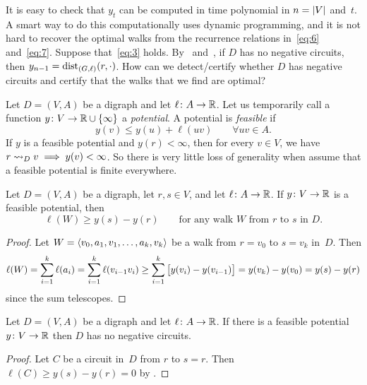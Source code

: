 \documentclass[10pt,reqno]{amsart}
\begin{document}
It is easy to check that \(y_t\) can be computed in time polynomial in
\(n = \card{V}\) and~\(t\).  A smart way to do this computationally
uses dynamic programming, and it is not hard to recover the optimal
walks from the recurrence relations in~\eqref{eq:6} and~\eqref{eq:7}.
Suppose that~\eqref{eq:3} holds.  By~
and~, if \(D\) has no negative circuits, then
\(y_{n-1} = \dist_{(G,\ell)}(r,\cdot)\).  How can we detect/certify
whether \(D\) has negative circuits and certify that the walks that we
find are optimal?

Let \(D = (V,A)\) be a digraph and let \(\ell \colon A \to \Reals\).
Let us temporarily call a function
\(y \colon V \to \Reals \cup \set{\infty}\) a \emph{potential}.  A
potential is \emph{feasible} if
\begin{equation*}
  y(v) \leq y(u) + \ell(uv)
  \qquad
  \forall uv \in A.
\end{equation*}
If \(y\) is a feasible potential and \(y(r) < \infty\), then for every
\(v \in V\), we have \(r \reaches_D v \implies y(v) < \infty\).  So
there is very little loss of generality when assume that a feasible
potential is finite everywhere.

\begin{theorem}
  \label{thm:1}
  Let \(D = (V,A)\) be a digraph, let \(r,s \in V\), and let
  \(\ell \colon A \to \Reals\).  If \(y \colon V \to \Reals\) is a
  feasible potential, then
  \begin{equation}
    \label{eq:10}
    \ell(W) \geq y(s) - y(r)
    \qquad
    \text{for any walk~\(W\) from~\(r\) to~\(s\) in~\(D\)}.
  \end{equation}
\end{theorem}
\begin{proof}
  Let \(W = \seq{v_0,a_1,v_1,\dotsc,a_k,v_k}\) be a walk from
  \(r = v_0\) to \(s = v_k\) in~\(D\).  Then
  \begin{equation*}
    \ell(W)
    =
    \sum_{i=1}^k \ell(a_i)
    =
    \sum_{i=1}^k \ell(v_{i-1}v_i)
    \geq
    \sum_{i=1}^k \sqbrac[\big]{y(v_i)-y(v_{i-1})}
    =
    y(v_k) - y(v_0)
    =
    y(s) - y(r)
  \end{equation*}
  since the sum telescopes.
\end{proof}

\begin{corollary}
  Let \(D = (V,A)\) be a digraph and let \(\ell \colon A \to \Reals\).
  If there is a feasible potential \(y \colon V \to \Reals\) then
  \(D\) has no negative circuits.
\end{corollary}
\begin{proof}
  Let \(C\) be a circuit in~\(D\) from \(r\) to \(s = r\).  Then
  \(\ell(C) \geq y(s) - y(r) = 0\) by .
\end{proof}
\end{document}
